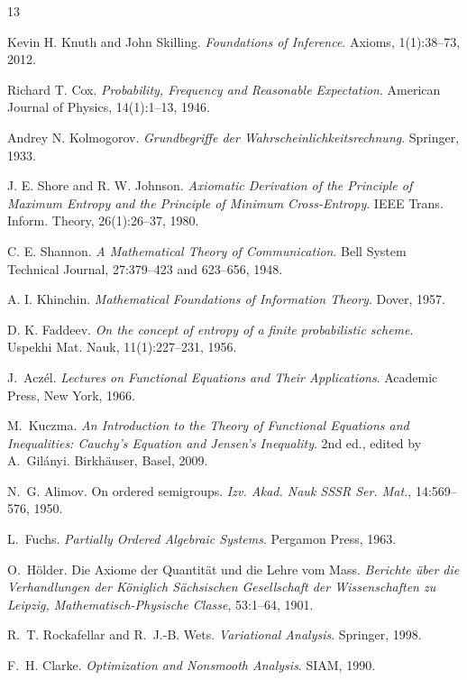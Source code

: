 \documentclass[11pt]{article}
\theoremstyle{definition}
\theoremstyle{remark}
\begin{document}
\begin{thebibliography}{13}

Kevin H. Knuth and John Skilling.
\textit{Foundations of Inference}.
Axioms, 1(1):38--73, 2012.

Richard T. Cox.
\textit{Probability, Frequency and Reasonable Expectation}.
American Journal of Physics, 14(1):1--13, 1946.

Andrey N. Kolmogorov.
\textit{Grundbegriffe der Wahrscheinlichkeitsrechnung}.
Springer, 1933.

J. E. Shore and R. W. Johnson.
\textit{Axiomatic Derivation of the Principle of Maximum Entropy and the Principle of Minimum Cross-Entropy}.
IEEE Trans. Inform. Theory, 26(1):26--37, 1980.

C. E. Shannon.
\textit{A Mathematical Theory of Communication}.
Bell System Technical Journal, 27:379--423 and 623--656, 1948.

A. I. Khinchin.
\textit{Mathematical Foundations of Information Theory}.
Dover, 1957.

D. K. Faddeev.
\textit{On the concept of entropy of a finite probabilistic scheme}.
Uspekhi Mat. Nauk, 11(1):227--231, 1956.

J.~Acz\'el.
\textit{Lectures on Functional Equations and Their Applications}.
Academic Press, New York, 1966.

M.~Kuczma.
\textit{An Introduction to the Theory of Functional Equations and Inequalities: Cauchy's Equation and Jensen's Inequality}.
2nd ed., edited by A.~Gil\'anyi.
Birkh\"auser, Basel, 2009.

N.~G. Alimov.
On ordered semigroups.
\textit{Izv. Akad. Nauk SSSR Ser. Mat.}, 14:569--576, 1950.

L.~Fuchs.
\textit{Partially Ordered Algebraic Systems}.
Pergamon Press, 1963.

O.~H\"older.
Die Axiome der Quantit\"at und die Lehre vom Mass.
\textit{Berichte \"uber die Verhandlungen der K\"oniglich S\"achsischen Gesellschaft der Wissenschaften zu Leipzig,
Mathematisch-Physische Classe}, 53:1--64, 1901.

R.~T. Rockafellar and R.~J.-B. Wets.
\textit{Variational Analysis}.
Springer, 1998.

F.~H. Clarke.
\textit{Optimization and Nonsmooth Analysis}.
SIAM, 1990.


\end{thebibliography}
\end{document}
